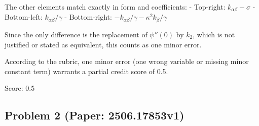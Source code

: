 \documentclass[10pt]{article}
\begin{document}
The other elements match exactly in form and coefficients:
- Top-right: \(k_{\alpha\beta} - \sigma\)
- Bottom-left: \(k_{\alpha\beta}/\gamma\)
- Bottom-right: \(-k_{\alpha\beta}/\gamma - \kappa^2 k_\beta/\gamma\)

Since the only difference is the replacement of \(\psi''(0)\) by \(k_2\), which is not justified or stated as equivalent, this counts as one minor error.

According to the rubric, one minor error (one wrong variable or missing minor constant term) warrants a partial credit score of 0.5.

Score: 0.5

\newpage
\subsection*{Problem 2 (Paper: 2506.17853v1)}
\end{document}
